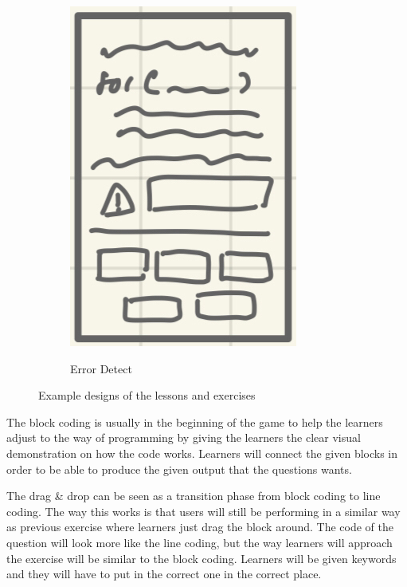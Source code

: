 \begin{figure}[!htbp]
\begin{subfigure}[b]{0.2\linewidth}
			\includegraphics[width=\textwidth]{Ex4.png}\\
			\caption{Error Detect}
		\end{subfigure}
		\caption{Example designs of the lessons and exercises}
		\label{fig:Exercises}
	\end{figure}
	
\newpage

The block coding is usually in the beginning of the game to help the learners adjust to the way of programming by giving the learners the clear visual demonstration on how the code works. Learners will connect the given blocks in order to be able to produce the given output that the questions wants.

The drag \& drop can be seen as a transition phase from block coding to line coding. The way this works is that users will still be performing in a similar way as previous exercise where learners just drag the block around. The code of the question will look more like the line coding, but the way learners will approach the exercise will be similar to the block coding. Learners will be given keywords and they will have to put in the correct one in the correct place.

